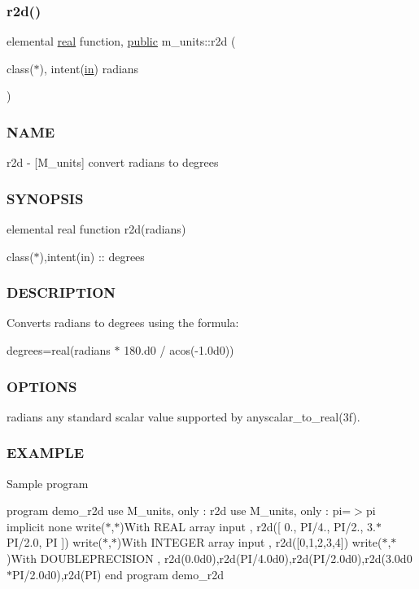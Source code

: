 \subsubsection{\texorpdfstring{r2d()}{r2d()}}
{\footnotesize\ttfamily elemental \hyperlink{read__watch_83_8txt_abdb62bde002f38ef75f810d3a905a823}{real} function, \hyperlink{M__stopwatch_83_8txt_a2f74811300c361e53b430611a7d1769f}{public} m\+\_\+units\+::r2d (\begin{DoxyParamCaption}\item[{class($\ast$), intent(\hyperlink{M__journal_83_8txt_afce72651d1eed785a2132bee863b2f38}{in})}]{radians }\end{DoxyParamCaption})}



\subsubsection*{N\+A\+ME}

r2d -\/ \mbox{[}M\+\_\+units\mbox{]} convert radians to degrees \subsubsection*{S\+Y\+N\+O\+P\+S\+IS}

elemental real function r2d(radians)

class($\ast$),intent(in) \+:\+: degrees \subsubsection*{D\+E\+S\+C\+R\+I\+P\+T\+I\+ON}

Converts radians to degrees using the formula\+:

degrees=real(radians $\ast$ 180.\+d0 / acos(-\/1.\+0d0)) \subsubsection*{O\+P\+T\+I\+O\+NS}

radians any standard scalar value supported by anyscalar\+\_\+to\+\_\+real(3f). \subsubsection*{E\+X\+A\+M\+P\+LE}

Sample program

program demo\+\_\+r2d use M\+\_\+units, only \+: r2d use M\+\_\+units, only \+: pi=$>$pi implicit none write($\ast$,$\ast$)\textquotesingle{}With R\+E\+AL array input \textquotesingle{}, r2d(\mbox{[} 0., P\+I/4., P\+I/2., 3.$\ast$\+P\+I/2.0, PI \mbox{]}) write($\ast$,$\ast$)\textquotesingle{}With I\+N\+T\+E\+G\+ER array input \textquotesingle{}, r2d(\mbox{[}0,1,2,3,4\mbox{]}) write($\ast$,$\ast$)\textquotesingle{}With D\+O\+U\+B\+L\+E\+P\+R\+E\+C\+I\+S\+I\+ON \textquotesingle{}, r2d(0.\+0d0),r2d(P\+I/4.\+0d0),r2d(P\+I/2.\+0d0),r2d(3.\+0d0$\ast$\+P\+I/2.0d0),r2d(\+P\+I) end program demo\+\_\+r2d


